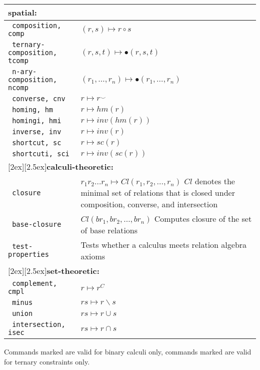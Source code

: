 \documentclass[headsepline]{scrreprt}
\theoremstyle{definition}
\newcommand{\binaryonly}{\raisebox{1ex}{\scriptsize(2)}}
\newcommand{\ternaryonly}{\raisebox{1ex}{\scriptsize(3)}}
\begin{document}
\begin{longtable}{|l|p{8cm}|}
\hline
\multicolumn{2}{|l|}{\bfseries spatial:}\\ \hline
\texttt{ composition, comp} & $ (r, s) \mapsto r \circ s$\\
\texttt{ ternary-composition, tcomp}\ternaryonly & $ (r, s, t) \mapsto \bullet (r,s,t)$\\
\texttt{ n-ary-composition, ncomp}& $ (r_1, \ldots, r_n) \mapsto \bullet (r_1, \ldots, r_n)$\\
\texttt{ converse, cnv}\binaryonly & $r \mapsto r^{\smile}$ \\
\texttt{ homing, hm}\ternaryonly & $ r \mapsto hm(r)$\\
\texttt{ homingi, hmi}\ternaryonly & $ r \mapsto inv(hm(r))$\\
\texttt{ inverse, inv}\ternaryonly & $ r \mapsto inv(r)$\\
\texttt{ shortcut, sc}\ternaryonly & $ r \mapsto sc(r)$\\
\texttt{ shortcuti, sci}\ternaryonly & $ r \mapsto inv(sc(r))$\\[1ex]
\hline
\multicolumn{2}{|l|}{\raisebox{-2ex}[2ex][2.5ex]{{\bfseries calculi-theoretic:}}}\\ \hline
\texttt{ closure} & $ r_1 r_2 \ldots r_n \mapsto Cl(r_1,r_2,\ldots, r_n)$\newline
$Cl$ denotes the minimal set of relations that is closed under composition, converse,
and intersection\\
\texttt{ base-closure} & $Cl(br_1,br_2,\ldots , br_n)$\newline
Computes closure of the set of base relations\\
\texttt{ test-properties} & Tests whether a calculus meets relation algebra axioms\\
\hline
\multicolumn{2}{|l|}{\raisebox{-2ex}[2ex][2.5ex]{{\bfseries set-theoretic:}}}\\ \hline
\texttt{ complement, cmpl} & $ r \mapsto r^C$\\
\texttt{ minus} & $ r s \mapsto r \backslash s$\\
\texttt{ union} & $ r s \mapsto r \cup s$\\
\texttt{ intersection, isec} & $ r s \mapsto r \cap s$\\
\hline
\end{longtable}
\noindent Commands marked \binaryonly are valid for binary calculi only, commands marked \ternaryonly are valid for ternary constraints only. 
\end{document}
